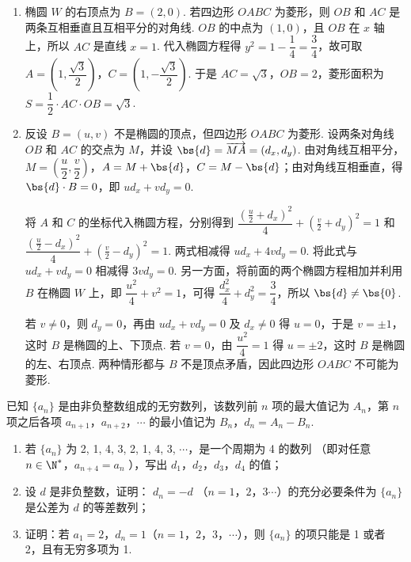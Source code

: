 \begin{solution}
\begin{enumerate}
\item 椭圆 \(W\) 的右顶点为 \(B=(2,0)\). 若四边形 \(OABC\) 为菱形，则 \(OB\) 和 \(AC\) 是两条互相垂直且互相平分的对角线. \(OB\) 的中点为 \((1,0)\)，且 \(OB\) 在 \(x\) 轴上，所以 \(AC\) 是直线 \(x=1\). 代入椭圆方程得
\(y^2=1-\dfrac14=\dfrac34\)，故可取 \(A=\left(1,\dfrac{\sqrt3}{2}\right)\)，\(C=\left(1,-\dfrac{\sqrt3}{2}\right)\). 于是 \(AC=\sqrt3\)，\(OB=2\)，菱形面积为
\(S=\dfrac12\cdot AC\cdot OB=\sqrt3\).

\item 反设 \(B=(u,v)\) 不是椭圆的顶点，但四边形 \(OABC\) 为菱形. 设两条对角线 \(OB\) 和 \(AC\) 的交点为 \(M\)，并设 \(\bs{d}=\overrightarrow{MA}=(d_x,d_y)\). 由对角线互相平分，
\(M=\left(\dfrac u2,\dfrac v2\right)\)，\(A=M+\bs{d}\)，\(C=M-\bs{d}\)；由对角线互相垂直，得
\(\bs{d}\cdot B=0\)，即 \(u d_x+v d_y=0\).

将 \(A\) 和 \(C\) 的坐标代入椭圆方程，分别得到
\(\dfrac{(\frac u2+d_x)^2}{4}+\left(\frac v2+d_y\right)^2=1\) 和
\(\dfrac{(\frac u2-d_x)^2}{4}+\left(\frac v2-d_y\right)^2=1\). 两式相减得
\(u d_x+4v d_y=0\). 将此式与 \(u d_x+v d_y=0\) 相减得 \(3v d_y=0\). 另一方面，将前面的两个椭圆方程相加并利用 \(B\) 在椭圆 \(W\) 上，即 \(\dfrac{u^2}{4}+v^2=1\)，可得
\(\dfrac{d_x^2}{4}+d_y^2=\dfrac34\)，所以 \(\bs{d}\ne\bs{0}\).

若 \(v\ne0\)，则 \(d_y=0\)，再由 \(u d_x+v d_y=0\) 及 \(d_x\ne0\) 得 \(u=0\)，于是 \(v=\pm1\)，这时 \(B\) 是椭圆的上、下顶点. 若 \(v=0\)，由 \(\dfrac{u^2}{4}=1\) 得 \(u=\pm2\)，这时 \(B\) 是椭圆的左、右顶点. 两种情形都与 \(B\) 不是顶点矛盾，因此四边形 \(OABC\) 不可能为菱形.
\end{enumerate}
\end{solution}

\begin{problem}
已知 \(\{a_{n}\}\) 是由非负整数组成的无穷数列，该数列前 \(n\) 项的最大值记为 \(A_{n}\)，第 \(n\) 项之后各项 \(a_{n+1}\)，\(a_{n+2}\)，\(\cdots\) 的最小值记为 \(B_{n}\)，\(d_{n} = A_{n} - B_{n}\).
\begin{enumerate}
\item 若 \( \{a_{n}\} \) 为 2, 1, 4, 3, 2, 1, 4, 3, \( \cdots \)，是一个周期为 4 的数列 （即对任意 \(n \in \N^{*}\)，\(a_{n+4} = a_{n}\) ），写出 \(d_{1}\)，\(d_{2}\)，\(d_{3}\)，\(d_{4}\) 的值；
\item 设 \(d\) 是非负整数，证明： \(d_{n} = -d \) （\(n = 1\)，\(2\)，\(3 \cdots\)）的充分必要条件为 \(\{a_{n}\}\) 是公差为 \(d\) 的等差数列；
\item 证明：若 \(a_{1} = 2\)，\(d_{n} = 1 \)（\(n = 1\)，\(2\)，\(3\)，\(\cdots\)），则 \(\{a_{n}\}\) 的项只能是 1 或者 2，且有无穷多项为 1.
\end{enumerate}
\end{problem}

